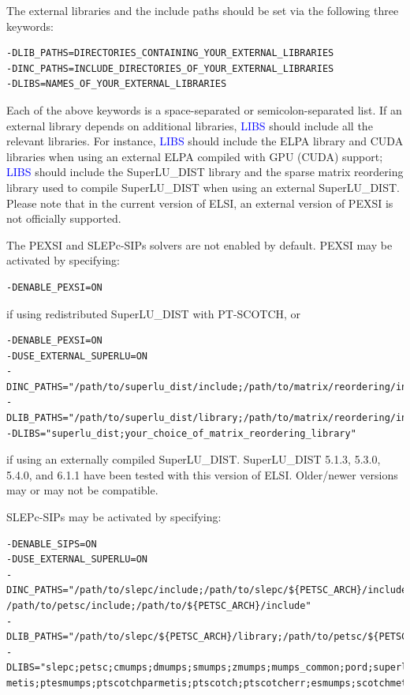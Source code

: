 \documentclass{report}
\begin{document}
The external libraries and the include paths should be set via the following three keywords:
\begin{tcolorbox}
\begin{verbatim}
-DLIB_PATHS=DIRECTORIES_CONTAINING_YOUR_EXTERNAL_LIBRARIES
-DINC_PATHS=INCLUDE_DIRECTORIES_OF_YOUR_EXTERNAL_LIBRARIES
-DLIBS=NAMES_OF_YOUR_EXTERNAL_LIBRARIES
\end{verbatim}
\end{tcolorbox}

Each of the above keywords is a space-separated or semicolon-separated list.  If an external library depends on additional libraries, \textcolor{blue}{LIBS} should include all the relevant libraries.  For instance, \textcolor{blue}{LIBS} should include the ELPA library and CUDA libraries when using an external ELPA compiled with GPU (CUDA) support; \textcolor{blue}{LIBS} should include the SuperLU\_DIST library and the sparse matrix reordering library used to compile SuperLU\_DIST when using an external SuperLU\_DIST.  Please note that in the current version of ELSI, an external version of PEXSI is not officially supported.

The PEXSI and SLEPc-SIPs solvers are not enabled by default.  PEXSI may be activated by specifying:
\begin{tcolorbox}
\begin{verbatim}
-DENABLE_PEXSI=ON
\end{verbatim}
\end{tcolorbox}

if using redistributed SuperLU\_DIST with PT-SCOTCH, or
\begin{tcolorbox}
\begin{verbatim}
-DENABLE_PEXSI=ON
-DUSE_EXTERNAL_SUPERLU=ON
-DINC_PATHS="/path/to/superlu_dist/include;/path/to/matrix/reordering/include"
-DLIB_PATHS="/path/to/superlu_dist/library;/path/to/matrix/reordering/include"
-DLIBS="superlu_dist;your_choice_of_matrix_reordering_library"
\end{verbatim}
\end{tcolorbox}

if using an externally compiled SuperLU\_DIST.  SuperLU\_DIST 5.1.3, 5.3.0, 5.4.0, and 6.1.1 have been tested with this version of ELSI.  Older/newer versions may or may not be compatible.

SLEPc-SIPs may be activated by specifying:
\begin{tcolorbox}
\begin{verbatim}
-DENABLE_SIPS=ON
-DUSE_EXTERNAL_SUPERLU=ON
-DINC_PATHS="/path/to/slepc/include;/path/to/slepc/${PETSC_ARCH}/include;
/path/to/petsc/include;/path/to/${PETSC_ARCH}/include"
-DLIB_PATHS="/path/to/slepc/${PETSC_ARCH}/library;/path/to/petsc/${PETSC_ARCH}/library"
-DLIBS="slepc;petsc;cmumps;dmumps;smumps;zmumps;mumps_common;pord;superlu_dist;parmetis;
metis;ptesmumps;ptscotchparmetis;ptscotch;ptscotcherr;esmumps;scotchmetis;scotch;scotcherr"
\end{verbatim}
\end{tcolorbox}
\end{document}
